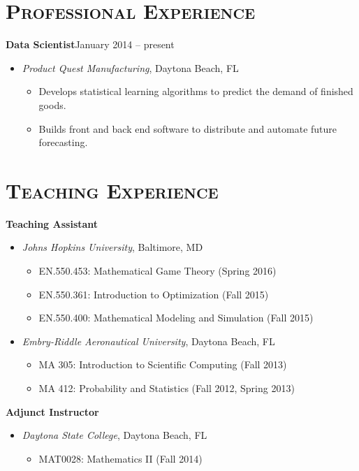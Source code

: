 \documentclass[10pt]{article}
\begin{document}
\section*{\textsc{Professional Experience}}
\textbf{Data Scientist}\hfill January 2014 -- present
\begin{itemize}[noitemsep]
    \item[] \textit{Product Quest Manufacturing}, Daytona Beach, FL
    \begin{itemize}[noitemsep]
        \item Develops statistical learning algorithms to predict the demand of finished goods.
        \item Builds front and back end software to distribute and automate future forecasting.
    \end{itemize}
\end{itemize}

\section*{\textsc{Teaching Experience}}
\textbf{Teaching Assistant}
\begin{itemize}[noitemsep]
    \item[] \textit{Johns Hopkins University}, Baltimore, MD
    \begin{itemize}[noitemsep]
        \item EN.550.453: Mathematical Game Theory (Spring 2016)
        \item EN.550.361: Introduction to Optimization (Fall 2015)
        \item EN.550.400: Mathematical Modeling and Simulation (Fall 2015)
    \end{itemize}
    \vspace{2ex}
    \item[] \textit{Embry-Riddle Aeronautical University}, Daytona Beach, FL
    \begin{itemize}[noitemsep]
        \item MA 305: Introduction to Scientific Computing (Fall 2013)
        \item MA 412: Probability and Statistics (Fall 2012, Spring 2013)
    \end{itemize}
\end{itemize}
\vspace{2ex}
\textbf{Adjunct Instructor}
\begin{itemize}[noitemsep]
    \item[] \textit{Daytona State College}, Daytona Beach, FL
    \begin{itemize}[noitemsep]
        \item MAT0028: Mathematics II (Fall 2014)
    \end{itemize}
\end{itemize}
\end{document}
